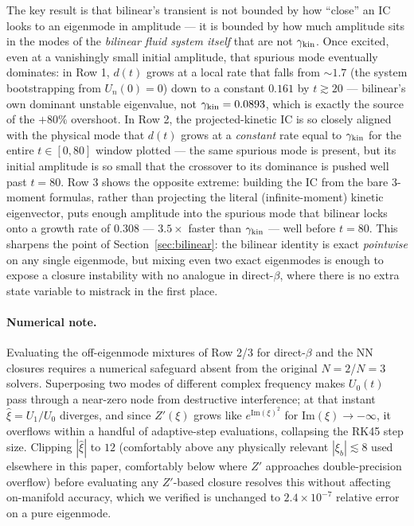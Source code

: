 \documentclass[11pt]{article}
\newcommand{\xib}{\xi_b}
\begin{document}
The key result is that bilinear's transient is not bounded by how
``close'' an IC looks to an eigenmode in amplitude --- it is bounded by
how much amplitude sits in the modes of the \emph{bilinear fluid
system itself} that are not $\gamma_{\rm kin}$. Once excited, even at
a vanishingly small initial amplitude, that spurious mode eventually
dominates: in Row 1, $d(t)$ grows at a local rate that falls from
$\sim\!1.7$ (the system bootstrapping from $U_n(0)=0$) down to a
constant $0.161$ by $t\gtrsim20$ --- bilinear's own dominant unstable
eigenvalue, not $\gamma_{\rm kin}=0.0893$, which is exactly the source
of the $+80\%$ overshoot. In Row 2, the projected-kinetic IC is so
closely aligned with the physical mode that $d(t)$ grows at a
\emph{constant} rate equal to $\gamma_{\rm kin}$ for the entire
$t\in[0,80]$ window plotted --- the same spurious mode is present, but
its initial amplitude is so small that the crossover to its dominance
is pushed well past $t=80$. Row 3 shows the opposite extreme: building
the IC from the bare 3-moment formulas, rather than projecting the
literal (infinite-moment) kinetic eigenvector, puts enough amplitude
into the spurious mode that bilinear locks onto a growth rate of
$0.308$ --- $3.5\times$ faster than $\gamma_{\rm kin}$ --- well before
$t=80$. This sharpens the point of Section~\ref{sec:bilinear}: the
bilinear identity is exact \emph{pointwise} on any single eigenmode,
but mixing even two exact eigenmodes is enough to expose a closure
instability with no analogue in direct-$\beta$, where there is no
extra state variable to mistrack in the first place.

\paragraph{Numerical note.} Evaluating the off-eigenmode mixtures of
Row 2/3 for direct-$\beta$ and the NN closures requires a numerical
safeguard absent from the original $N{=}2$/$N{=}3$ solvers. Superposing
two modes of different complex frequency makes $U_0(t)$ pass through a
near-zero node from destructive interference; at that instant
$\hat\xi=U_1/U_0$ diverges, and since $Z'(\xi)$ grows like
$e^{\mathrm{Im}(\xi)^2}$ for $\mathrm{Im}(\xi)\to-\infty$, it overflows
within a handful of adaptive-step evaluations, collapsing the RK45
step size. Clipping $|\hat\xi|$ to $12$ (comfortably above any
physically relevant $|\xib|\lesssim8$ used elsewhere in this paper,
comfortably below where $Z'$ approaches double-precision overflow)
before evaluating any $Z'$-based closure resolves this without
affecting on-manifold accuracy, which we verified is unchanged to
$2.4\times10^{-7}$ relative error on a pure eigenmode.
\end{document}
